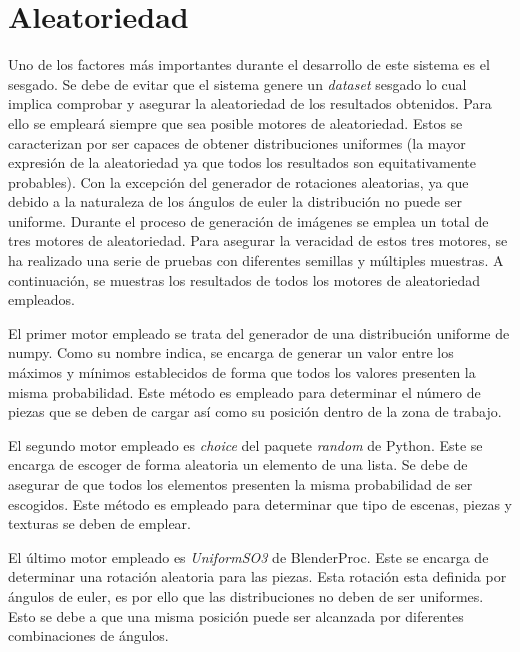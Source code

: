 \section{Aleatoriedad}
\label{chap:Generación de un dataset sec:Aleatoriedad}
Uno de los factores más importantes durante el desarrollo de este sistema es el sesgado. Se debe de evitar que el sistema genere un \textit{dataset} sesgado lo cual implica comprobar y asegurar la aleatoriedad de los resultados obtenidos. Para ello se empleará siempre que sea posible motores de aleatoriedad. Estos se caracterizan por ser capaces de obtener distribuciones uniformes (la mayor expresión de la aleatoriedad ya que todos los resultados son equitativamente probables). Con la excepción del generador de rotaciones aleatorias, ya que debido a la naturaleza de los ángulos de euler la distribución no puede ser uniforme. Durante el proceso de generación de imágenes se emplea un total de tres motores de aleatoriedad. Para asegurar la veracidad de estos tres motores, se ha realizado una serie de pruebas con diferentes semillas y múltiples muestras. A continuación, se muestras los resultados de todos los motores de aleatoriedad empleados.

El primer motor empleado se trata del generador de una distribución uniforme de numpy. Como su nombre indica, se encarga de generar un valor entre los máximos y mínimos establecidos de forma que todos los valores presenten la misma probabilidad. Este método es empleado para determinar el número de piezas que se deben de cargar así como su posición dentro de la zona de trabajo.

El segundo motor empleado es \textit{choice} del paquete \textit{random} de Python. Este se encarga de escoger de forma aleatoria un elemento de una lista. Se debe de asegurar de que todos los elementos presenten la misma probabilidad de ser escogidos. Este método es empleado para determinar que tipo de escenas, piezas y texturas se deben de emplear.

El último motor empleado es \textit{UniformSO3} de BlenderProc. Este se encarga de determinar una rotación aleatoria para las piezas. Esta rotación esta definida por ángulos de euler, es por ello que las distribuciones no deben de ser uniformes. Esto se debe a que una misma posición puede ser alcanzada por diferentes combinaciones de ángulos.

